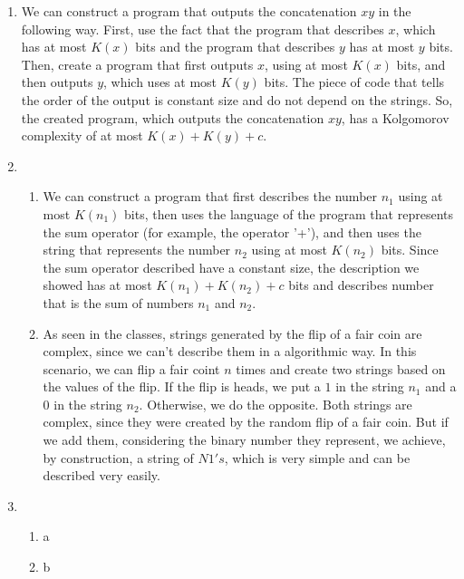 \documentclass{article}
\begin{document}
\begin{enumerate}
	\item We can construct a program that outputs the concatenation \(xy\) in the following way. First, use the fact that the program that describes \(x\),
	      which has at most \(K(x)\) bits and the program that describes \(y\) has at most \(y\) bits. Then, create a program that first outputs \(x\), using at most \(K(x)\) bits, and then outputs \(y\), which uses at most \(K(y)\) bits.
	      The piece of code that tells the order of the output is constant size and do not depend on the strings. So, the created program, which outputs the concatenation \(xy\), has a Kolgomorov complexity of at most \(K(x) + K(y) + c\).
	\item \begin{enumerate}
		      \item We can construct a program that first describes the number \(n_1\) using at most \(K(n_1)\) bits, then uses the language of the program that represents the sum operator (for example, the operator '+'), and then
		            uses the string that represents the number \(n_2\) using at most \(K(n_2)\) bits. Since the sum operator described have a constant size, the description we showed has at most \(K(n_1) + K(n_2) + c\) bits and describes number
		            that is the sum of numbers \(n_1\) and \(n_2\).
		      \item As seen in the classes, strings generated by the flip of a fair coin are complex, since we can't describe them in a algorithmic way. In this scenario, we can flip a fair coint \(n\) times and create two strings based
		            on the values of the flip. If the flip is heads, we put a \(1\) in the string \(n_1\) and a \(0\) in the string \(n_2\). Otherwise, we do the opposite. Both strings are complex, since they were created by the random flip of a fair coin. But if we add them, considering the binary number they represent, we achieve, by construction,
		            a string of \(N 1's\), which is very simple and can be described very easily.
	      \end{enumerate}
	\item \begin{enumerate}
		      \item a
		      \item b
	      \end{enumerate}
\end{enumerate}


\nocite{*}
\end{document}
